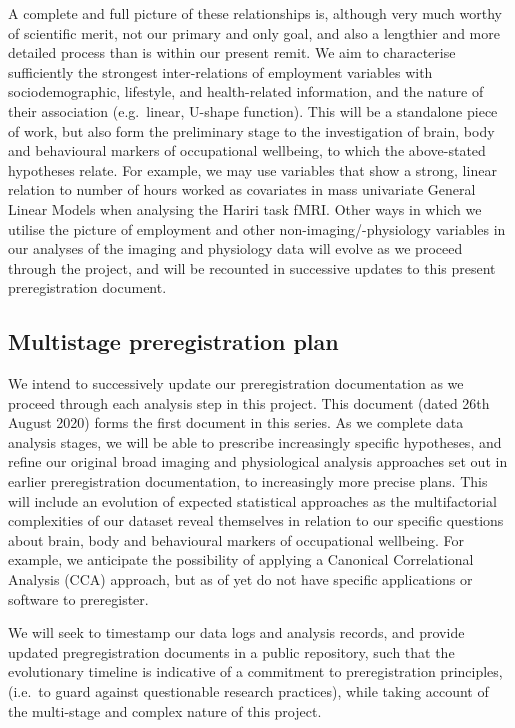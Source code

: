 \documentclass[
  english,
  man, donotrepeattitle]{apa6}
\begin{document}
A complete and full picture of these relationships is, although very much worthy of scientific merit, not our primary and only goal, and also a lengthier and more detailed process than is within our present remit. We aim to characterise sufficiently the strongest inter-relations of employment variables with sociodemographic, lifestyle, and health-related information, and the nature of their association (e.g.~linear, U-shape function). This will be a standalone piece of work, but also form the preliminary stage to the investigation of brain, body and behavioural markers of occupational wellbeing, to which the above-stated hypotheses relate. For example, we may use variables that show a strong, linear relation to number of hours worked as covariates in mass univariate General Linear Models when analysing the Hariri task fMRI. Other ways in which we utilise the picture of employment and other non-imaging/-physiology variables in our analyses of the imaging and physiology data will evolve as we proceed through the project, and will be recounted in successive updates to this present preregistration document.

\newpage

\hypertarget{multistage-preregistration-plan}{%
\subsection{Multistage preregistration plan}\label{multistage-preregistration-plan}}

We intend to successively update our preregistration documentation as we proceed through each analysis step in this project. This document (dated 26th August 2020) forms the first document in this series. As we complete data analysis stages, we will be able to prescribe increasingly specific hypotheses, and refine our original broad imaging and physiological analysis approaches set out in earlier preregistration documentation, to increasingly more precise plans. This will include an evolution of expected statistical approaches as the multifactorial complexities of our dataset reveal themselves in relation to our specific questions about brain, body and behavioural markers of occupational wellbeing. For example, we anticipate the possibility of applying a Canonical Correlational Analysis (CCA) approach, but as of yet do not have specific applications or software to preregister.

We will seek to timestamp our data logs and analysis records, and provide updated pregregistration documents in a public repository, such that the evolutionary timeline is indicative of a commitment to preregistration principles, (i.e.~to guard against questionable research practices), while taking account of the multi-stage and complex nature of this project.
\end{document}
